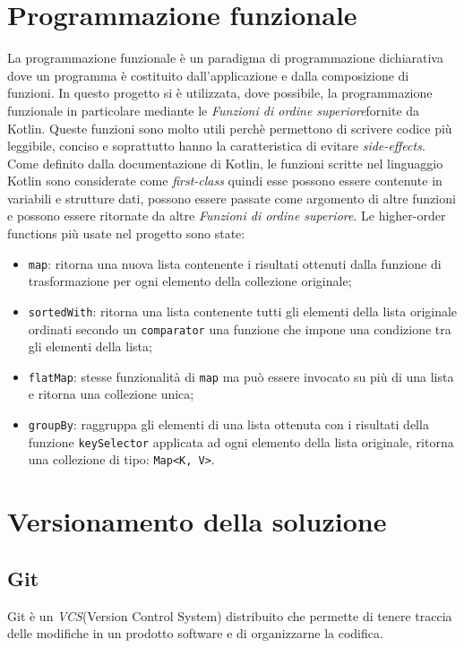 \section{Programmazione funzionale}
La programmazione funzionale è un paradigma di programmazione dichiarativa dove un programma è costituito dall'applicazione e dalla composizione di funzioni. In questo progetto si è utilizzata, dove possibile, la programmazione funzionale in particolare mediante le \emph{Funzioni di ordine superiore}\glosp fornite da Kotlin. Queste funzioni sono molto utili perchè permettono di scrivere codice più leggibile, conciso e soprattutto hanno la caratteristica di evitare \emph{side-effects}\glo. Come definito dalla documentazione di Kotlin, le funzioni scritte nel linguaggio Kotlin sono considerate come \emph{first-class} quindi esse possono essere contenute in variabili e strutture dati, possono essere passate come argomento di altre funzioni e possono essere ritornate da altre \emph{Funzioni di ordine superiore}. Le higher-order functions più usate nel progetto sono state:
\begin{itemize}
	\item \verb|map|: ritorna una nuova lista contenente i risultati ottenuti dalla funzione di trasformazione per ogni elemento della collezione originale;
	\item \verb|sortedWith|: ritorna una lista contenente tutti gli elementi della lista originale ordinati secondo un \verb|comparator| una funzione che impone una condizione tra gli elementi della lista;
	\item \verb|flatMap|: stesse funzionalità di \verb|map| ma può essere invocato su più di una lista e ritorna una collezione unica;
	\item \verb|groupBy|: raggruppa gli elementi di una lista ottenuta con i risultati della funzione \verb|keySelector| applicata ad ogni elemento della lista originale, ritorna una collezione di tipo: \verb|Map<K, V>|.
\end{itemize}

\section{Versionamento della soluzione}
\subsection{Git}
Git è un \emph{VCS}\glosp (Version Control System) distribuito che permette di tenere traccia delle modifiche in un prodotto software e di organizzarne la codifica. 

